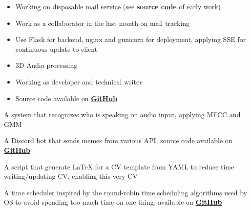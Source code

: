 
\begin{itemize}
\item Working on disposable mail service (see \textbf{\href{https://github.com/Huy-Ngo/temp-mail}{source code}} of early work)
\item Work as a collaborator in the last month on mail tracking
\item Use Flask for backend, nginx and gunicorn for deployment, applying SSE for continuous update to client
\end{itemize}

\begin{itemize}
\item 3D Audio processing
\item Working as developer and technical writer
\item Source code available on \textbf{\href{https://github.com/McSinyx/palace}{GitHub}}
\end{itemize}

\divider

A system that recognizes who is speaking on audio input, applying MFCC and GMM

\divider

A Discord bot that sends memes from various API, source code available on \textbf{\href{https://github.com/Huy-Ngo/discord-meme-bot}{GitHub}}

\divider

A script that generate LaTeX for a CV template from YAML to reduce time writing/updating CV, enabling this very CV

\divider

A time scheduler inspired by the round-robin time scheduling algorithms used by OS to avoid spending too much time on one thing, available on \textbf{\href{https://github.com/Huy-Ngo/round-robin}{GitHub}}
